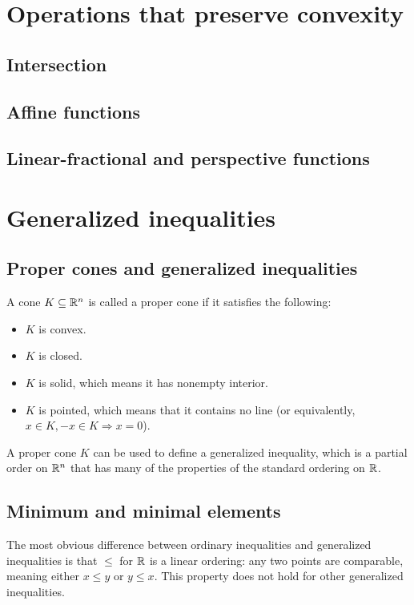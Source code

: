 \documentclass[11pt,oneside,a4paper]{book}
\theoremstyle{definition}
\DeclareRobustCommand{\[}{\begin{equation}}
\DeclareRobustCommand{\]}{\end{equation}}
\begin{document}
\section{Operations that preserve convexity}

\subsection{Intersection}

\subsection{Affine functions}

\subsection{Linear-fractional and perspective functions}

\section{Generalized inequalities}

\subsection{Proper cones and generalized inequalities}

A cone $ K\subseteq \mathbb{R}^n $ is called a proper cone if it satisfies the following:
\begin{itemize}
\item $ K $ is convex.
\item $ K $ is closed.
\item $ K $ is solid, which means it has nonempty interior.
\item $ K $ is pointed, which means that it contains no line (or equivalently, $ x\in K, -x\in K\Rightarrow x=0 $).
\end{itemize}
A proper cone $ K $ can be used to define a generalized inequality, which is a partial order on $ \mathbb{R}^n $ that has many of the properties of the standard ordering on $ \mathbb{R} $.

\subsection{Minimum and minimal elements}

The most obvious difference between ordinary inequalities and generalized inequalities is that $ \leq $ for $ \mathbb{R} $ is a linear ordering: any two points are comparable, meaning either $ x\leq y $ or $ y\leq x $. This property does not hold for other generalized inequalities.
\end{document}
